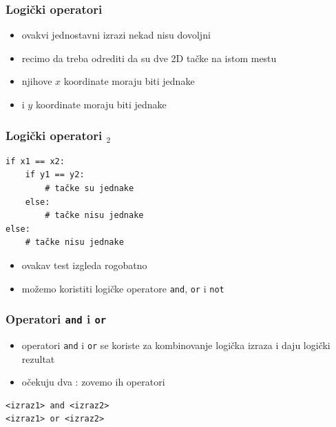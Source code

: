 \documentclass[utf8,compress]{beamer}
\begin{document}
\begin{frame}[fragile]
  \frametitle{Logički operatori}
  \begin{itemize}
    \item ovakvi jednostavni izrazi nekad nisu dovoljni
    \item recimo da treba odrediti da su dve 2D tačke na istom mestu
    \item njihove $x$ koordinate moraju biti jednake
    \item i $y$ koordinate moraju biti jednake
  \end{itemize}
\end{frame}

\begin{frame}[fragile]
  \frametitle{Logički operatori $_2$}
\begin{verbatim}
if x1 == x2:
    if y1 == y2:
        # tačke su jednake
    else:
        # tačke nisu jednake
else:
    # tačke nisu jednake
\end{verbatim}
  \begin{itemize}
    \item ovakav test izgleda rogobatno
    \item možemo koristiti logičke operatore \texttt{and}, \texttt{or} i \texttt{not}
  \end{itemize}
\end{frame}

\begin{frame}[fragile]
  \frametitle{Operatori \texttt{and} i \texttt{or}}
  \begin{itemize}
    \item operatori \texttt{and} i \texttt{or} se koriste za kombinovanje  logička izraza i daju logički rezultat
    \item očekuju dva : zovemo ih  operatori
  \end{itemize}
\begin{verbatim}
<izraz1> and <izraz2>
<izraz1> or <izraz2>
\end{verbatim}
\end{frame}
\end{document}
